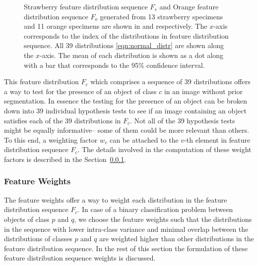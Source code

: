 \documentclass {udthesis}
\begin{document}
\begin{figure}
\begin{subfigure}[]{0.8\textwidth}
      \caption{}
      \label{fig:feat_distr_orange}
  \end{subfigure}
\caption[Feature distribution]{Strawberry feature distribution sequence $F_s$ and Orange feature distribution sequence $F_o$ generated from 13 strawberry specimens and 11 orange specimens are shown in  and  respectively. The $x$-axis corresponds to the index of the distributions in feature distribution sequence. All 39 distributions \eqref{eqn:normal_distr} are shown along the $x$-axis. The  mean of each distribution is shown as a dot along with a bar that corresponds to the 95\% confidence interval.}
\label{fig:feat_distr}
\end{figure}	
%

This feature distribution $F_c$ which comprises a sequence of 39 distributions offers a way to test for the presence of an object of class $c$ in an image without prior segmentation. In essence the testing for the presence of an object can be broken down into 39 individual hypothesis tests to see if an image containing an object satisfies each of the 39 distributions in $F_c$. Not all of the 39 hypothesis tests might be equally informative-- some of them could be more relevant than others. To this end, a weighting factor $w_{v}$ can be attached to the $v$-th element in feature distribution sequence $F_c$.  The details involved in the computation of these weight factors is described in the Section~\ref{sec:distdes_feat_wts}.

\subsubsection{Feature Weights}
\label{sec:distdes_feat_wts}

The feature weights offer a way to weight each distribution in the feature distribution sequence $F_c$. In case of a binary classification problem between objects of class $p$ and $q$, we choose the feature weights such that the distributions in the sequence with lower intra-class variance and minimal overlap between the distributions of classes $p$ and $q$ are weighted higher than other distributions in the feature distribution sequence. In the rest of this section the formulation of these feature distribution sequence weights is discussed.
\end{document}
